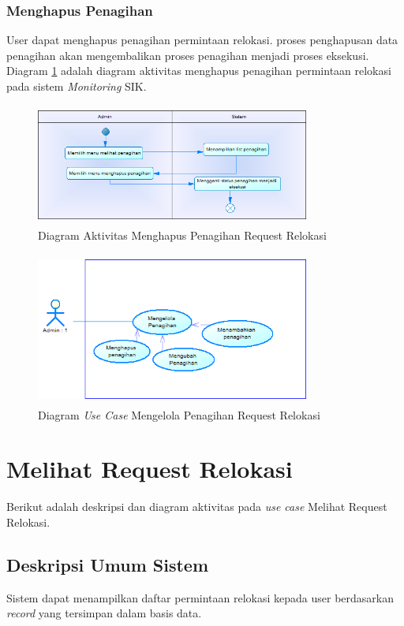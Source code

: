 	\subsubsection{Menghapus Penagihan}
	User dapat menghapus penagihan permintaan relokasi. proses penghapusan data penagihan akan mengembalikan proses penagihan menjadi proses eksekusi. Diagram \ref{figure:activity_menghapus_penagihan} adalah diagram aktivitas menghapus penagihan permintaan relokasi pada sistem \textit{Monitoring} SIK.
	\begin{figure}[h]
	\centerline {\includegraphics[width=9cm,height=4cm]{bab4/ActivityDiagram_MenghapusPenagihan.png}}
	\caption{Diagram Aktivitas Menghapus Penagihan Request Relokasi}
	\label{figure:activity_menghapus_penagihan}
	\end{figure}		

	\begin{figure}[h]
	\centerline {\includegraphics[width=9cm,height=5cm]{bab4/use-case-mengelola-penagihan.png}}
	\caption{Diagram \textit{Use Case} Mengelola Penagihan Request Relokasi}
	\label{figure:use_case_mengelola_penagihan}
	\end{figure}

\section{Melihat Request Relokasi}
Berikut adalah deskripsi dan diagram aktivitas pada \textit{use case} Melihat Request Relokasi.
\subsection{Deskripsi Umum Sistem}
\tab Sistem dapat menampilkan daftar permintaan relokasi kepada user berdasarkan \textit{record} yang tersimpan dalam basis data.
